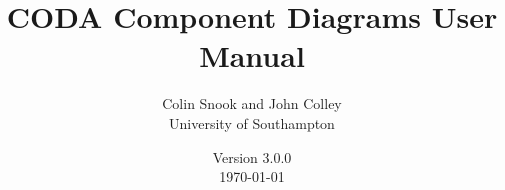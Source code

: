 \documentclass[a4paper,10pt]{article}
\title{CODA Component Diagrams User Manual}
\author{Colin Snook and John Colley\\University of Southampton}
\date{%
  Version 3.0.0\\%
  \today%
}
\begin{document}
\ifplastex%
\maketitle%
\else%
 \ifstandalone%
 \maketitle %
 \else%
 \fi%
\fi%




















%
%
%
%
%
%
%
%
%


\end{document}

